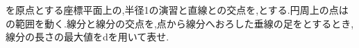 \begin{problem}
を原点とする座標平面上の,半径1の演習と直線との交点を,とする.円周上の点はの範囲を動く.線分と線分の交点を,点から線分へおろした垂線の足をとするとき,線分の長さの最大値をdを用いて表せ.
\end{problem}
